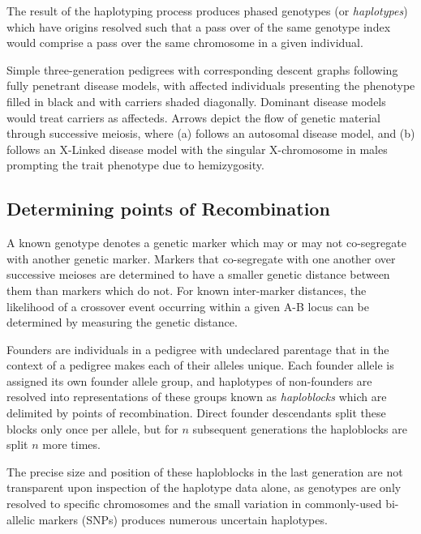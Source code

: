 The result of the haplotyping process produces phased genotypes (or \textit{haplotypes}) which have origins resolved such that a pass over of the same genotype index would comprise a pass over the same chromosome in a given individual.

	{Simple three-generation pedigrees with corresponding descent graphs following fully penetrant disease models, with affected individuals presenting the phenotype filled in black and with carriers shaded diagonally. Dominant disease models would treat carriers as affecteds. Arrows depict the flow of genetic material through successive meiosis, where (a) follows an autosomal disease model, and (b) follows an X-Linked disease model with the singular X-chromosome in males prompting the trait phenotype due to hemizygosity.}

\vspace{-10pt}
\subsection{Determining points of Recombination}

\enlargethispage{20pt}
A known genotype denotes a genetic marker which may or may not co-segregate with another genetic marker. Markers that co-segregate with one another over successive meioses are determined to have a smaller genetic distance between them than markers which do not. For known inter-marker distances, the likelihood of a crossover event occurring within a given A-B locus can be determined by measuring the genetic distance.


Founders are individuals in a pedigree with undeclared parentage that in the context of a pedigree makes each of their alleles unique. Each founder allele is assigned its own founder allele group, and haplotypes of non-founders are resolved into representations of these groups known as \textit{haploblocks} which are delimited by points of recombination. Direct founder descendants split these blocks only once per allele, but for $n$ subsequent generations the haploblocks are split $n$ more times.

The precise size and position of these haploblocks in the last generation are not transparent upon inspection of the haplotype data alone, as genotypes are only resolved to specific chromosomes and the small variation in commonly-used bi-allelic markers (SNPs) produces numerous uncertain haplotypes.\

